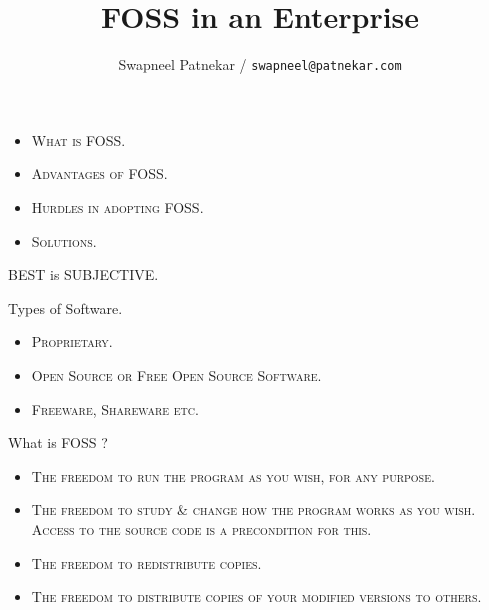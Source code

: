 \documentclass{beamer}
\author{Swapneel Patnekar / \texttt{swapneel@patnekar.com}}
\title{FOSS in an Enterprise}
\begin{document}
\begin{frame}
  \titlepage
\end{frame}




\begin{frame}{}
\begin{center}

\begin{itemize}\itemsep1pt \parskip0pt 
\item \textsc{\small What is FOSS.}
\item \textsc{\small Advantages of FOSS.}
\item \textsc{\small Hurdles in adopting FOSS.}
\item \textsc{\small Solutions.}
\end{itemize}
\end{center}
\end{frame}



\begin{frame}{}
\begin{center}
\small{BEST is SUBJECTIVE.}
\end{center}

\end{frame}

\begin{frame}{}
\begin{center}
Types of Software.
\begin{itemize}\itemsep1pt \parskip0pt 
\item \textsc{\small Proprietary.}
\item \textsc{\small Open Source or Free Open Source Software.}
\item \textsc{\small Freeware, Shareware etc.}
\end{itemize}
\end{center}
\end{frame}


\begin{frame}{}
\begin{center}
What is FOSS ? 
\begin{itemize}\itemsep1pt \parskip0pt 
\item \textsc{\small The freedom to run the program as you wish, for any purpose.}
\item \textsc{\small The freedom to study \& change how the program works as you wish. Access to the source code is a precondition for this.}
\item \textsc{\small The freedom to redistribute copies.}
\item \textsc{\small The freedom to distribute copies of your modified versions to others.}
\end{itemize}
\end{center}
\end{frame}
\end{document}
